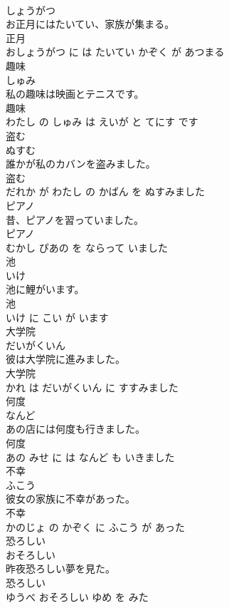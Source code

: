 \documentclass[8pt]{extreport}
\begin{document}
\begin{CJK}{UTF8}{min}
\\	しょうがつ			
\\	お正月にはたいてい、家族が集まる。	
\\	正月 
\\	おしょうがつ に は たいてい かぞく が あつまる			
\\	趣味	
\\	しゅみ			
\\	私の趣味は映画とテニスです。	
\\	趣味 
\\	わたし の しゅみ は えいが と てにす です			
\\	盗む	
\\	ぬすむ			
\\	誰かが私のカバンを盗みました。	
\\	盗む 
\\	だれか が わたし の かばん を ぬすみました			
\\	ピアノ	
\\	昔、ピアノを習っていました。	
\\	ピアノ 
\\	むかし ぴあの を ならって いました			
\\	池	
\\	いけ			
\\	池に鯉がいます。	
\\	池 
\\	いけ に こい が います			
\\	大学院	
\\	だいがくいん			
\\	彼は大学院に進みました。	
\\	大学院 
\\	かれ は だいがくいん に すすみました			
\\	何度	
\\	なんど			
\\	あの店には何度も行きました。	
\\	何度 
\\	あの みせ に は なんど も いきました			
\\	不幸	
\\	ふこう			
\\	彼女の家族に不幸があった。	
\\	不幸 
\\	かのじょ の かぞく に ふこう が あった			
\\	恐ろしい	
\\	おそろしい			
\\	昨夜恐ろしい夢を見た。	
\\	恐ろしい 
\\	ゆうべ おそろしい ゆめ を みた			

\end{CJK}
\end{document}
